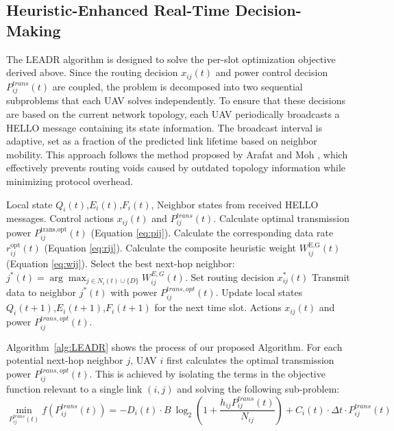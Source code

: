 \documentclass[runningheads]{llncs}
\begin{document}
\subsection{Heuristic-Enhanced Real-Time Decision-Making}
The LEADR algorithm is designed to solve the per-slot optimization objective derived above. Since the routing decision $x_{ij}(t)$ and power control decision $P_{ij}^{trans}(t)$ are coupled, the problem is decomposed into two sequential subproblems that each UAV solves independently. To ensure that these decisions are based on the current network topology, each UAV periodically broadcasts a HELLO message containing its state information. The broadcast interval is adaptive, set as a fraction of the predicted link lifetime based on neighbor mobility. This approach follows the method proposed by Arafat and Moh \cite{qtar}, which effectively prevents routing voids caused by outdated topology information while minimizing protocol overhead.
\begin{algorithm}[!ht]
    \caption{LEADR Decentralized Routing and Power Control}
    \label{alg:LEADR}
    \renewcommand{\algorithmicrequire}{\textbf{Input:}}
    \renewcommand{\algorithmicensure}{\textbf{Output:}}
    \begin{algorithmic}[1]
        \REQUIRE Local state $Q_i(t)$,$E_i(t)$,$F_i(t)$, Neighbor states from received HELLO messages.
        \ENSURE Control actions $x_{ij}(t)$ and $P_{ij}^{trans}(t)$.
            \STATE Calculate optimal transmission power $P_{ij}^{\text{trans,opt}}(t)$ (Equation \ref{eq:pij}).
            \STATE Calculate the corresponding data rate $r_{ij}^{\text{opt}}(t)$ (Equation \ref{eq:rij}).
            \STATE Calculate the composite heuristic weight $W_{ij}^{\text{E,G}}(t)$ (Equation \ref{eq:wij}).
        \ENDFOR
        \STATE Select the best next-hop neighbor: $j^{*}(t)=\arg\max_{j\in N_{i}(t)\cup\{D\}}W_{ij}^{E,G}(t)$.
        \STATE Set routing decision $x_{ij}^{*}(t)$
        \STATE Transmit data to neighbor $j^{*}(t)$ with power $P_{ij}^{trans,opt}(t)$.
        \STATE Update local states $Q_i(t+1)$,$E_i(t+1)$,$F_i(t+1)$ for the next time slot.
        \RETURN Actions $x_{ij}(t)$ and power $P_{ij}^{trans,opt}(t)$.
    \end{algorithmic}
\end{algorithm}

Algorithm~\ref{alg:LEADR} shows the process of our proposed Algorithm. For each potential next-hop neighbor $j$, UAV $i$ first calculates the optimal transmission power $P_{ij}^{trans,opt}(t)$. This is achieved by isolating the terms in the objective function relevant to a single link $(i,j)$ and solving the following sub-problem:
\begin{equation}
    \min_{P_{ij}^{trans}(t)}f(P_{ij}^{trans}(t))=-D_{i}(t)\cdot B~\log_{2}\left(1+\frac{h_{ij}P_{ij}^{trans}(t)}{N_{ij}}\right)+C_{i}(t)\cdot\Delta t\cdot P_{ij}^{trans}(t)
\end{equation}
\end{document}
